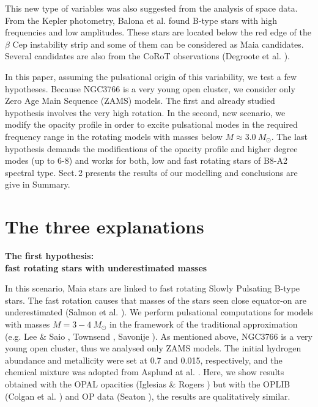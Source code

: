 \documentclass[epj,twocolumn]{webofc}
\begin{document}
This new type of variables was also suggested from the analysis of space data.
From the Kepler photometry, Balona et al. \cite{2011MNRAS.413.2403B,2015MNRAS.451.1445B,2016MNRAS.460.1318B} found B-type stars with high frequencies and low amplitudes.
These stars are located below the red edge of the $\beta$ Cep instability strip and some of them can be considered as Maia candidates.
Several candidates are also from the CoRoT observations (Degroote et al. \citep{2009A&A...506..471D}).

In this paper, assuming the pulsational origin of this variability, we test a few hypotheses.
Because NGC3766 is a very young open cluster, we consider only Zero Age Main Sequence (ZAMS) models.
The first and already studied hypothesis involves the very high rotation.
In the second, new scenario, we modify the opacity profile in order to excite pulsational modes
in the required frequency range in the rotating models with masses below $M\approx 3.0~M_\odot$.
The last hypothesis demands the modifications of the opacity profile and higher degree modes (up to 6-8)
and works for both, low and fast rotating stars of B8-A2 spectral type.
Sect.\,2 presents the results of our modelling and conclusions are give in Summary.

\section{The three explanations}
\label{sec-1}

{\bf The first hypothesis:\\
fast rotating stars with underestimated masses}

In this scenario, Maia stars are linked to fast rotating Slowly Pulsating B-type stars.
The fast rotation causes that masses of the stars seen close equator-on  are underestimated (Salmon et al. \citep{2014A&A...569A..18S}).
We perform pulsational computations for models with masses $M=3-4~ M_\odot$ in the framework of the traditional approximation (e.g. Lee \& Saio \citep{1997ApJ...491..839L}, Townsend \citep{2003MNRAS.340.1020T}, Savonije \citep{2005A&A...443..557S}).
As mentioned above, NGC3766 is a very young open cluster, thus we analysed only ZAMS models. The initial hydrogen abundance and metallicity were set at 0.7 and 0.015, respectively,
and the chemical mixture was adopted from Asplund at al. \cite{AGSS09}. Here, we show results obtained with the OPAL opacities (Iglesias \& Rogers \citep{OPAL}) but with the OPLIB (Colgan et al. \citep{OPLIB2,OPLIB1})
and OP data (Seaton \citep{OP}), the results are qualitatively similar.
\end{document}
